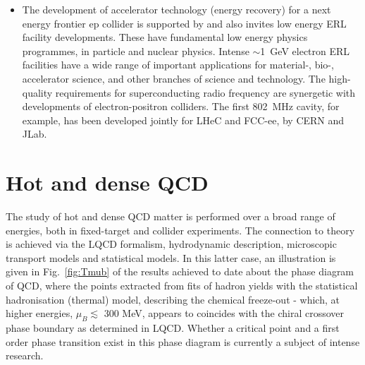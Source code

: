 \begin{itemize}
\item The development of accelerator technology (energy recovery) for a next
energy frontier ep collider is supported by and also invites low energy ERL
facility developments. These have fundamental low energy physics programmes, in
particle and nuclear physics. Intense $\sim$1~GeV electron ERL facilities have
a wide range of important applications for material-, bio-, accelerator science,
and other branches of science and technology. The high-quality requirements for
superconducting radio frequency are synergetic with developments of
electron-positron colliders. The first 802~MHz cavity, for example, has been
developed jointly for LHeC and FCC-ee, by CERN and JLab.

\end{itemize}

\section{Hot and dense QCD}
\label{hot}

The study of hot and dense QCD matter is performed over a broad range of energies, both in fixed-target and collider experiments.
The connection to theory is achieved via the LQCD formalism, hydrodynamic description, microscopic transport models and statistical models.
In this latter case, an illustration is given in Fig.~\ref{fig:Tmub} of the results achieved to date about the phase diagram of QCD, where the points extracted from fits of hadron yields with the statistical hadronisation (thermal) model, describing the chemical freeze-out - which, at higher energies, $\mu_B\lesssim$ 300 MeV, appears to coincides with the chiral crossover phase boundary as determined in LQCD.
Whether a critical point and a first order phase transition exist in this phase diagram is currently a subject of intense research.

